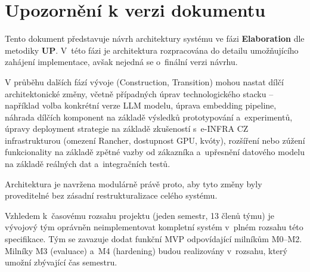 \documentclass[a4paper, 11pt]{article}
\begin{document}
\newpage
\section{Upozornění k verzi dokumentu}

Tento dokument představuje návrh architektury systému ve fázi \textbf{Elaboration} dle metodiky \textbf{UP}. V~této fázi je architektura rozpracována do detailu umožňujícího zahájení implementace, avšak nejedná se o~finální verzi návrhu.

V průběhu dalších fází vývoje (Construction, Transition) mohou nastat dílčí architektonické změny, včetně případných úprav technologického stacku -- například volba konkrétní verze LLM modelu, úprava embedding pipeline, náhrada dílčích komponent na základě výsledků prototypování a~experimentů, úpravy deployment strategie na základě zkušeností s~e-INFRA CZ infrastrukturou (omezení Rancher, dostupnost GPU, kvóty), rozšíření nebo zúžení funkcionality na základě zpětné vazby od zákazníka a~upřesnění datového modelu na základě reálných dat a~integračních testů.

Architektura je navržena modulárně právě proto, aby tyto změny byly proveditelné bez zásadní restrukturalizace celého systému.

Vzhledem k~časovému rozsahu projektu (jeden semestr, 13 členů týmu) je vývojový tým oprávněn neimplementovat kompletní systém v~plném rozsahu této specifikace. Tým se zavazuje dodat funkční MVP odpovídající milníkům M0--M2. Milníky M3 (evaluace) a~M4 (hardening) budou realizovány v~rozsahu, který umožní zbývající čas semestru.
\end{document}
